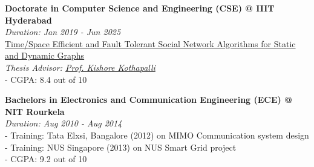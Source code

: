 \textbf{Doctorate in Computer Science and Engineering (CSE) @ IIIT Hyderabad} \\
\emph{Duration: Jan 2019 - Jun 2025} \\
\href{https://puzzlef.github.io}{Time/Space Efficient and Fault Tolerant Social Network Algorithms for Static and Dynamic Graphs} \\
\emph{Thesis Advisor: \href{https://faculty.iiit.ac.in/~kkishore/}{Prof. Kishore Kothapalli}} \\
- CGPA: 8.4 out of 10

\noindent
\textbf{Bachelors in Electronics and Communication Engineering (ECE) @ NIT Rourkela} \\
\emph{Duration: Aug 2010 - Aug 2014} \\
- Training: Tata Elxsi, Bangalore (2012) on MIMO Communication system design \\
- Training: NUS Singapore (2013) on NUS Smart Grid project \\
- CGPA: 9.2 out of 10
